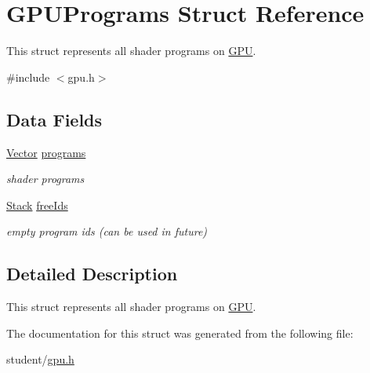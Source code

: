 \hypertarget{structGPUPrograms}{}\section{G\+P\+U\+Programs Struct Reference}
\label{structGPUPrograms}


This struct represents all shader programs on \hyperlink{structGPU}{G\+PU}.  




{\ttfamily \#include $<$gpu.\+h$>$}

\subsection*{Data Fields}
\begin{DoxyCompactItemize}
\item 
\mbox{\label{structGPUPrograms_acd9c5b21b7e31c1ad4c31310606e9bc0}} 
\hyperlink{structVector}{Vector} \hyperlink{structGPUPrograms_acd9c5b21b7e31c1ad4c31310606e9bc0}{programs}
\begin{DoxyCompactList}\small\item\em shader programs \end{DoxyCompactList}\item 
\mbox{\label{structGPUPrograms_a11bebb4cc2122d7e38a083103a9cdefa}} 
\hyperlink{structStack}{Stack} \hyperlink{structGPUPrograms_a11bebb4cc2122d7e38a083103a9cdefa}{free\+Ids}
\begin{DoxyCompactList}\small\item\em empty program ids (can be used in future) \end{DoxyCompactList}\end{DoxyCompactItemize}


\subsection{Detailed Description}
This struct represents all shader programs on \hyperlink{structGPU}{G\+PU}. 

The documentation for this struct was generated from the following file\+:\begin{DoxyCompactItemize}
\item 
student/\hyperlink{gpu_8h}{gpu.\+h}\end{DoxyCompactItemize}
